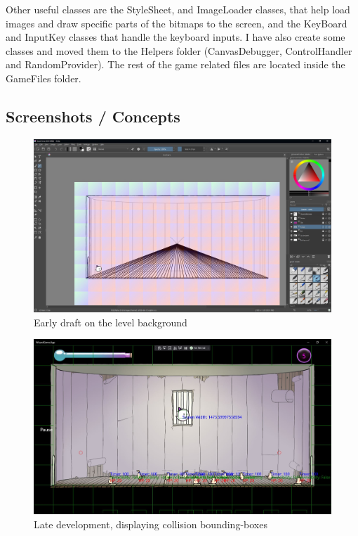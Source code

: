 \documentclass[12pt]{article}
\begin{document}
        Other useful classes are the StyleSheet, and ImageLoader classes, that help load images and draw specific parts of the bitmaps to the screen, and the KeyBoard and InputKey classes that handle the keyboard inputs. I have also create some classes and moved them to the Helpers folder (CanvasDebugger, ControlHandler and RandomProvider). The rest of the game related files are located inside the GameFiles folder.

\subsection{Screenshots / Concepts}

\begin{figure}[H]
    \centering
    \includegraphics[max width=\textwidth]{images/002.JPG}
    \caption{Early draft on the level background}
\end{figure}

\begin{figure}[H]
    \centering
    \includegraphics[max width=\textwidth]{images/019.JPG}
    \caption{Late development, displaying collision bounding-boxes}
\end{figure}
\end{document}
